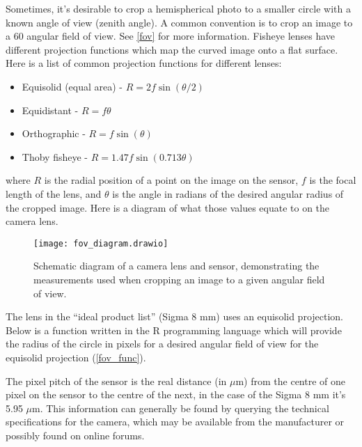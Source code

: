 \documentclass{article}
\newcommand\file[1]{\texttt{\underline{#1}}}
\begin{document}
Sometimes, it's desirable to crop a hemispherical photo to a smaller circle with a known angle of view (zenith angle). A common convention is to crop an image to a 60\textdegree{} angular field of view. See \autoref{fov} for more information. Fisheye lenses have different projection functions which map the curved image onto a flat surface. Here is a list of common projection functions for different lenses:

\begin{itemize}
	\item{Equisolid (equal area) - $R = 2f\sin{(\theta/2)}$}
	\item{Equidistant - $R = f\theta$}
	\item{Orthographic - $R = f\sin{(\theta)}$}
	\item{Thoby fisheye - $R = 1.47f\sin{(0.713\theta)}$}
\end{itemize}

where $R$ is the radial position of a point on the image on the sensor, $f$ is the focal length of the lens, and $\theta$ is the angle in radians of the desired angular radius of the cropped image. Here is a diagram of what those values equate to on the camera lens.

\begin{figure}[H]
\centering
	\texttt{[image: fov\_diagram.drawio]}
	\caption{Schematic diagram of a camera lens and sensor, demonstrating the measurements used when cropping an image to a given angular field of view.}
	\label{fov_diagram}
\end{figure}

The lens in the ``ideal product list'' (Sigma 8 mm) uses an equisolid projection. Below is a function written in the R programming language which will provide the radius of the circle in pixels for a desired angular field of view for the equisolid projection (\autoref{fov_func}).

\begin{minipage}{\linewidth}

\end{minipage}

The pixel pitch of the sensor is the real distance (in $\mu$m) from the centre of one pixel on the sensor to the centre of the next, in the case of the Sigma 8 mm it's 5.95 $\mu$m. This information can generally be found by querying the technical specifications for the camera, which may be available from the manufacturer or possibly found on online forums.
\end{document}
